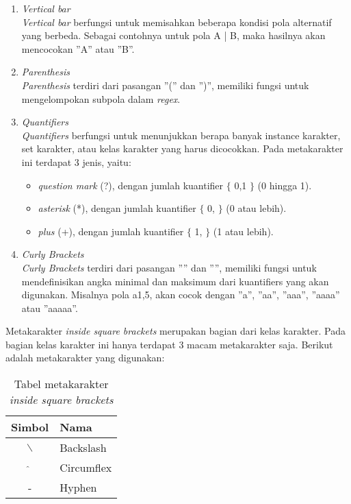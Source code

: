 \begin{enumerate}
	\item \textit{Vertical bar} \\
	\textit{Vertical bar} berfungsi untuk memisahkan beberapa kondisi pola alternatif yang berbeda. Sebagai contohnya untuk pola A | B, maka hasilnya akan mencocokan ''A'' atau ''B''.
	
	\item \textit{Parenthesis} \\
	\textit{Parenthesis} terdiri dari pasangan ''('' dan '')'', memiliki fungsi untuk mengelompokan subpola dalam \textit{regex}.	
	
	\item \textit{Quantifiers} \\
	\textit{Quantifiers} berfungsi untuk menunjukkan berapa banyak instance karakter, set karakter, atau kelas karakter yang harus dicocokkan. Pada metakarakter ini terdapat 3 jenis, yaitu:
	\begin{itemize}
		\item \textit{question mark} (?), dengan jumlah kuantifier $\lbrace$ 0,1 $\rbrace$ (0 hingga 1).
		\item \textit{asterisk} (*), dengan jumlah kuantifier $\lbrace$ 0, $\rbrace$ (0 atau lebih). 
		\item \textit{plus} (+), dengan jumlah kuantifier $\lbrace$ 1, $\rbrace$ (1 atau lebih). 
	\end{itemize}	 

	\item \textit{Curly Brackets} \\
	\textit{Curly Brackets} terdiri dari pasangan ''{'' dan ''}'', memiliki fungsi untuk mendefinisikan angka minimal dan maksimum dari kuantifiers yang akan digunakan. Misalnya pola a{1,5}, akan cocok dengan ''a'', ''aa'', ''aaa'', ''aaaa'' atau ''aaaaa''.
	
\end{enumerate}
		
Metakarakter \textit{inside square brackets} merupakan bagian dari kelas karakter. Pada bagian kelas  karakter ini hanya terdapat 3 macam metakarakter saja. Berikut adalah metakarakter yang digunakan:
		
\begin{table}[H]
	\renewcommand{\arraystretch}{1.5}
	\caption {Tabel metakarakter \textit{inside square brackets}} 
	\label{tab:metacharacters-inside}
	\begin{center}
		\begin{tabular}{|c|l|}
		\hline 
		Simbol & Nama \\ 
		\hline 
		$\backslash$ & Backslash \\ 
		\hline 
		$\hat{}$ & Circumflex \\ 
		\hline 
		- & Hyphen \\ 
		\hline
		\end{tabular}
	\end{center}
\end{table}

